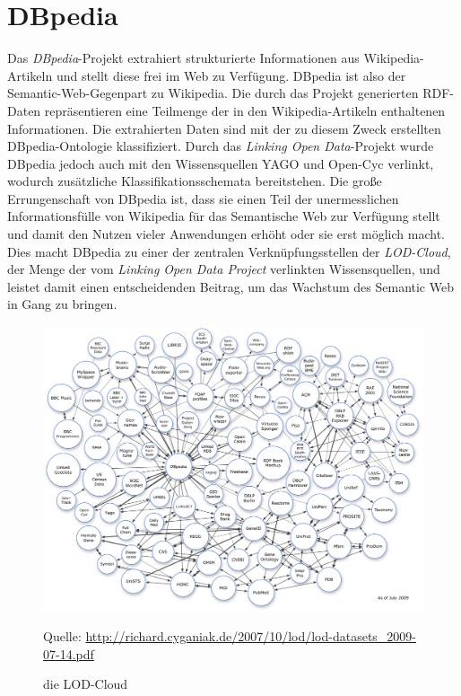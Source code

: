 \section{DBpedia}
Das \textit{DBpedia}-Projekt extrahiert strukturierte Informationen aus Wikipedia-Artikeln und 
stellt diese frei im Web zu Verfügung. 
DBpedia ist also der Semantic-Web-Gegenpart zu Wikipedia.
Die durch das Projekt generierten RDF-Daten repräsentieren eine Teilmenge der in den Wikipedia-Artikeln enthaltenen Informationen.
Die extrahierten Daten sind mit der zu diesem Zweck erstellten DBpedia-Ontologie klassifiziert. Durch das \emph{Linking Open Data}-Projekt wurde DBpedia jedoch auch mit den
Wissensquellen YAGO und Open-Cyc verlinkt, wodurch zusätzliche Klassifikationsschemata bereitstehen.
Die große Errungenschaft von DBpedia ist, dass sie einen Teil der unermesslichen Informationsfülle von Wikipedia
für das Semantische Web zur Verfügung stellt und damit den Nutzen vieler Anwendungen erhöht oder sie erst möglich macht.
Dies macht DBpedia zu einer der zentralen Verknüpfungsstellen der \emph{LOD-Cloud}, der Menge der vom \emph{Linking Open Data Project} \citep{lod} verlinkten Wissensquellen, und leistet damit einen entscheidenden Beitrag, um das Wachstum des Semantic Web in Gang zu bringen.
\begin{figure}[h]
\begin{center}
\begin{threeparttable}
\includegraphics[width=\textwidth]{img/pdf/lod-cloud.pdf}
\begin{tablenotes}
\item [] \begin{footnotesize} Quelle: \url{http://richard.cyganiak.de/2007/10/lod/lod-datasets_2009-07-14.pdf}\end{footnotesize}
\end{tablenotes}
\end{threeparttable}
\end{center}
\caption{die LOD-Cloud}
\end{figure}
